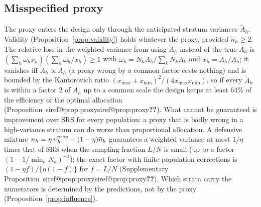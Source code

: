 \documentclass[pdflatex,sn-mathphys-num,iicol]{sn-jnl}
\makeatletter
\theoremstyle{thmstyleone}
\theoremstyle{thmstyletwo}
\theoremstyle{thmstylethree}
\newcommand{\SIref}[1]{\ifcsname siref@#1\endcsname\csname siref@#1\endcsname\else\textbf{??}\fi}
\makeatother
\begin{document}
\subsection{Misspecified proxy}\label{sec:theory-proxy}

The proxy enters the design only through the anticipated stratum variances $\tilde A_h$. Validity (Proposition~\ref{prop:validity}) holds whatever the proxy, provided $\tilde n_h\ge2$.
The relative loss in the weighted variance from using $\tilde A_h$ instead of the true $A_h$ is
$(\sum_h\omega_hx_h)(\sum_h\omega_h/x_h)\ge1$ with $\omega_h=N_hA_h/\sum_kN_kA_k$ and $x_h=\tilde A_h/A_h$; it vanishes iff $\tilde A_h\propto A_h$ (a proxy wrong by a common factor
costs nothing) and is bounded by the Kantorovich ratio $(x_{\max}+x_{\min})^2/(4x_{\max}x_{\min})$, so if every $\tilde A_h$ is within a factor 2 of $A_h$ up to a common scale the design keeps at least 64\% of the
efficiency of the optimal allocation (Proposition~\SIref{prop:proxy}). What cannot be guaranteed is improvement over SRS for every population: a proxy that is badly wrong in a high-variance stratum
can do worse than proportional allocation. A defensive mixture $n_h=\eta\,n^{\rm prop}_h+(1-\eta)\tilde n_h$ guarantees a weighted variance at most $1/\eta$ times that of SRS when the sampling fraction $L/N$ is small (up to a factor $(1-1/\min_hN_h)^{-1}$); the exact factor with finite-population corrections is $(1-\eta f)/\{\eta(1-f)\}$ for $f=L/N$ (Supplementary Proposition~\SIref{prop:proxy}). Which strata carry the numerators is determined
by the predictions, not by the proxy (Proposition~\ref{prop:influence}).
\end{document}
